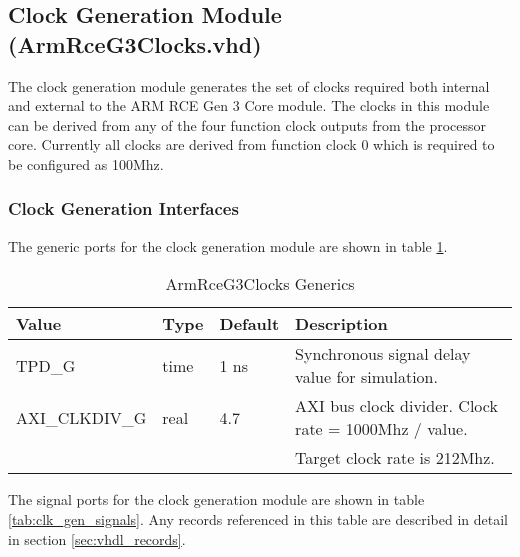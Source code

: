 \documentclass[11pt]{article}
\begin{document}
\subsection{Clock Generation Module (ArmRceG3Clocks.vhd)}
\label{subsec:ArmRceG3Clocks}

The clock generation module generates the set of clocks required both internal and external to
the ARM RCE Gen 3 Core module. The clocks in this module can be derived from any of the four function 
clock outputs from the processor core. Currently all clocks are derived from function clock 0 which is
required to be configured as 100Mhz.

\subsubsection{Clock Generation Interfaces}

The generic ports for the clock generation module are shown in table \ref{tab:clk_gen_generics}.

\begin{table}[H]
\small
\centering
   \begin{tabular}{| l | l | l | l | }
      \hline \textbf{Value} & \textbf{Type} & \textbf{Default} & \textbf{Description} \\
      \hline TPD\_G          & time    & 1 ns & Synchronous signal delay value for simulation.   \\
      \hline AXI\_CLKDIV\_G  & real    & 4.7   & AXI bus clock divider. Clock rate = 1000Mhz / value. \\
                             &         &       & Target clock rate is 212Mhz.                         \\
      \hline
   \end{tabular}
   \caption{ArmRceG3Clocks Generics}
   \label{tab:clk_gen_generics}
\end{table}

The signal ports for the clock generation module are shown in table \ref{tab:clk_gen_signals}.
Any records referenced in this table are described in detail in section \ref{sec:vhdl_records}. 
\end{document}
